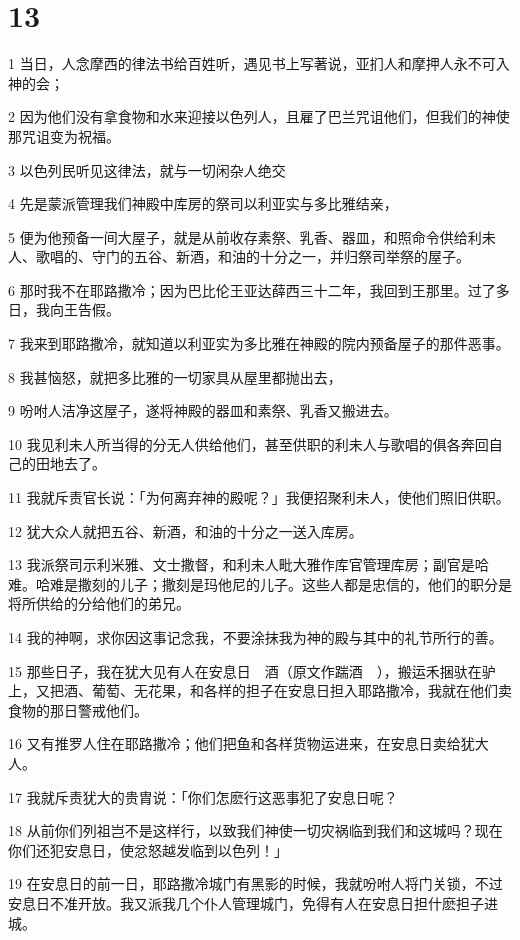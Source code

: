 \chapter{13}

\par 1 当日，人念摩西的律法书给百姓听，遇见书上写著说，亚扪人和摩押人永不可入神的会；
\par 2 因为他们没有拿食物和水来迎接以色列人，且雇了巴兰咒诅他们，但我们的神使那咒诅变为祝福。
\par 3 以色列民听见这律法，就与一切闲杂人绝交
\par 4 先是蒙派管理我们神殿中库房的祭司以利亚实与多比雅结亲，
\par 5 便为他预备一间大屋子，就是从前收存素祭、乳香、器皿，和照命令供给利未人、歌唱的、守门的五谷、新酒，和油的十分之一，并归祭司举祭的屋子。
\par 6 那时我不在耶路撒冷；因为巴比伦王亚达薛西三十二年，我回到王那里。过了多日，我向王告假。
\par 7 我来到耶路撒冷，就知道以利亚实为多比雅在神殿的院内预备屋子的那件恶事。
\par 8 我甚恼怒，就把多比雅的一切家具从屋里都抛出去，
\par 9 吩咐人洁净这屋子，遂将神殿的器皿和素祭、乳香又搬进去。
\par 10 我见利未人所当得的分无人供给他们，甚至供职的利未人与歌唱的俱各奔回自己的田地去了。
\par 11 我就斥责官长说：「为何离弃神的殿呢？」我便招聚利未人，使他们照旧供职。
\par 12 犹大众人就把五谷、新酒，和油的十分之一送入库房。
\par 13 我派祭司示利米雅、文士撒督，和利未人毗大雅作库官管理库房；副官是哈难。哈难是撒刻的儿子；撒刻是玛他尼的儿子。这些人都是忠信的，他们的职分是将所供给的分给他们的弟兄。
\par 14 我的神啊，求你因这事记念我，不要涂抹我为神的殿与其中的礼节所行的善。
\par 15 那些日子，我在犹大见有人在安息日　酒（原文作踹酒　），搬运禾捆驮在驴上，又把酒、葡萄、无花果，和各样的担子在安息日担入耶路撒冷，我就在他们卖食物的那日警戒他们。
\par 16 又有推罗人住在耶路撒冷；他们把鱼和各样货物运进来，在安息日卖给犹大人。
\par 17 我就斥责犹大的贵胄说：「你们怎麽行这恶事犯了安息日呢？
\par 18 从前你们列祖岂不是这样行，以致我们神使一切灾祸临到我们和这城吗？现在你们还犯安息日，使忿怒越发临到以色列！」
\par 19 在安息日的前一日，耶路撒冷城门有黑影的时候，我就吩咐人将门关锁，不过安息日不准开放。我又派我几个仆人管理城门，免得有人在安息日担什麽担子进城。
